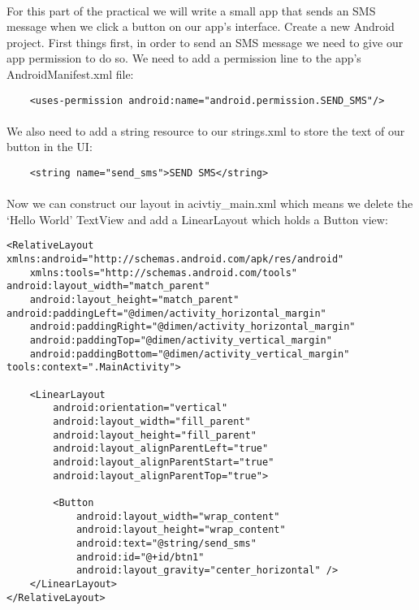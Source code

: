 \paragraph{} For this part of the practical we will write a small app that sends an SMS message when we click a button on our app's interface. Create a new Android project. First things first, in order to send an SMS message we need to give our app permission to do so. We need to add a permission line to the app's AndroidManifest.xml file:

\begin{lstlisting}
    <uses-permission android:name="android.permission.SEND_SMS"/>
\end{lstlisting}

\paragraph{} We also need to add a string resource to our strings.xml to store the text of our button in the UI:

\begin{lstlisting}
    <string name="send_sms">SEND SMS</string>
\end{lstlisting}

\paragraph{} Now we can construct our layout in acivtiy\_main.xml which means we delete the `Hello World' TextView and add a LinearLayout which holds a Button view:

\begin{lstlisting}
<RelativeLayout xmlns:android="http://schemas.android.com/apk/res/android"
    xmlns:tools="http://schemas.android.com/tools" android:layout_width="match_parent"
    android:layout_height="match_parent" android:paddingLeft="@dimen/activity_horizontal_margin"
    android:paddingRight="@dimen/activity_horizontal_margin"
    android:paddingTop="@dimen/activity_vertical_margin"
    android:paddingBottom="@dimen/activity_vertical_margin" tools:context=".MainActivity">

    <LinearLayout
        android:orientation="vertical"
        android:layout_width="fill_parent"
        android:layout_height="fill_parent"
        android:layout_alignParentLeft="true"
        android:layout_alignParentStart="true"
        android:layout_alignParentTop="true">

        <Button
            android:layout_width="wrap_content"
            android:layout_height="wrap_content"
            android:text="@string/send_sms"
            android:id="@+id/btn1"
            android:layout_gravity="center_horizontal" />
    </LinearLayout>
</RelativeLayout>
\end{lstlisting}

